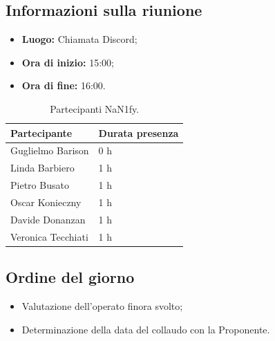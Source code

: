 \documentclass[8pt]{article}
\begin{document}
\subsection{Informazioni sulla riunione}
\begin{itemize}
	\setlength\itemsep{0em}
	\item\textbf{Luogo:} Chiamata Discord;
	\item\textbf{Ora di inizio:} 15:00;
	\item\textbf{Ora di fine:}  16:00.
\end{itemize}
\begin{table}[ht!]
	\begin{minipage}[t]{0.5\linewidth}
		\centering
		\begin{tabular}{p{3cm} p{3cm}}
			\toprule
			\textbf{Partecipante} & \textbf{Durata presenza} \\
			\midrule
			Guglielmo Barison & 0 h \\
			Linda Barbiero & 1 h \\
			Pietro Busato & 1 h \\
			Oscar Konieczny & 1 h \\
			Davide Donanzan & 1 h \\
			Veronica Tecchiati & 1 h \\
			\bottomrule
		\end{tabular}
		\caption{Partecipanti NaN1fy.}
		\label{table:Partecipanti NaN1fy}
	\end{minipage} 
\end{table}
\subsection{Ordine del giorno}
\begin{itemize}
\setlength\itemsep{0em}
    \item Valutazione dell'operato finora svolto;
    \item Determinazione della data del collaudo con la Proponente.
\end{itemize}
\end{document}
